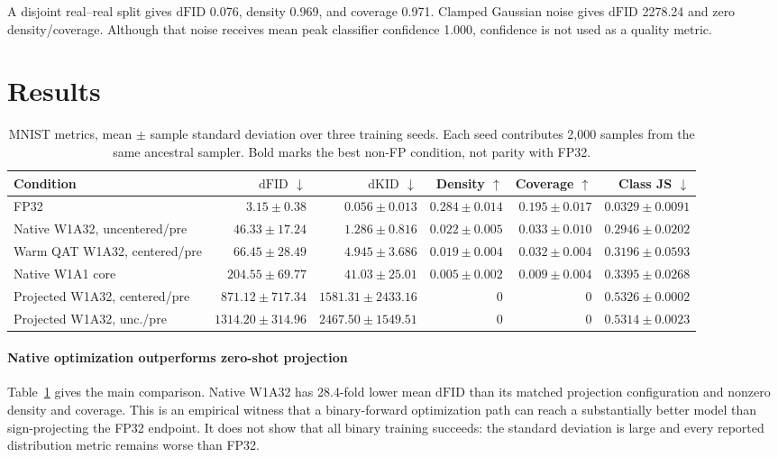 \documentclass[conference]{IEEEtran}
\newcommand{\dfid}{\ensuremath{\mathrm{dFID}}}
\newcommand{\dkid}{\ensuremath{\mathrm{dKID}}}
\begin{document}
A disjoint real--real split gives \dfid{} 0.076, density 0.969, and coverage
0.971. Clamped Gaussian noise gives \dfid{} 2278.24 and zero density/coverage.
Although that noise receives mean peak classifier confidence 1.000, confidence
is not used as a quality metric.

\section{Results}

\begin{table}[t]
\centering
\caption{MNIST metrics, mean $\pm$ sample standard deviation over three training
seeds. Each seed contributes 2,000 samples from the same ancestral sampler.
Bold marks the best non-FP condition, not parity with FP32.}
\label{tab:results}
\small
\setlength{\tabcolsep}{4pt}
\begin{tabular}{lrrrrr}
\toprule
Condition & \dfid{} $\downarrow$ & \dkid{} $\downarrow$ & Density $\uparrow$ & Coverage $\uparrow$ & Class JS $\downarrow$ \\
\midrule
FP32 & $3.15\pm0.38$ & $0.056\pm0.013$ & $0.284\pm0.014$ & $0.195\pm0.017$ & $0.0329\pm0.0091$ \\
Native W1A32, uncentered/pre & $\mathbf{46.33\pm17.24}$ & $\mathbf{1.286\pm0.816}$ & $\mathbf{0.022\pm0.005}$ & $\mathbf{0.033\pm0.010}$ & $\mathbf{0.2946\pm0.0202}$ \\
Warm QAT W1A32, centered/pre & $66.45\pm28.49$ & $4.945\pm3.686$ & $0.019\pm0.004$ & $0.032\pm0.004$ & $0.3196\pm0.0593$ \\
Native W1A1 core & $204.55\pm69.77$ & $41.03\pm25.01$ & $0.005\pm0.002$ & $0.009\pm0.004$ & $0.3395\pm0.0268$ \\
Projected W1A32, centered/pre & $871.12\pm717.34$ & $1581.31\pm2433.16$ & $0$ & $0$ & $0.5326\pm0.0002$ \\
Projected W1A32, unc./pre & $1314.20\pm314.96$ & $2467.50\pm1549.51$ & $0$ & $0$ & $0.5314\pm0.0023$ \\
\bottomrule
\end{tabular}
\end{table}

\paragraph{Native optimization outperforms zero-shot projection}
Table~\ref{tab:results} gives the main comparison. Native W1A32 has 28.4-fold
lower mean \dfid{} than its matched projection configuration and nonzero density and
coverage. This is an empirical witness that a binary-forward optimization path
can reach a substantially better model than sign-projecting the FP32 endpoint.
It does not show that all binary training succeeds: the standard deviation is
large and every reported distribution metric remains worse than FP32.
\end{document}
